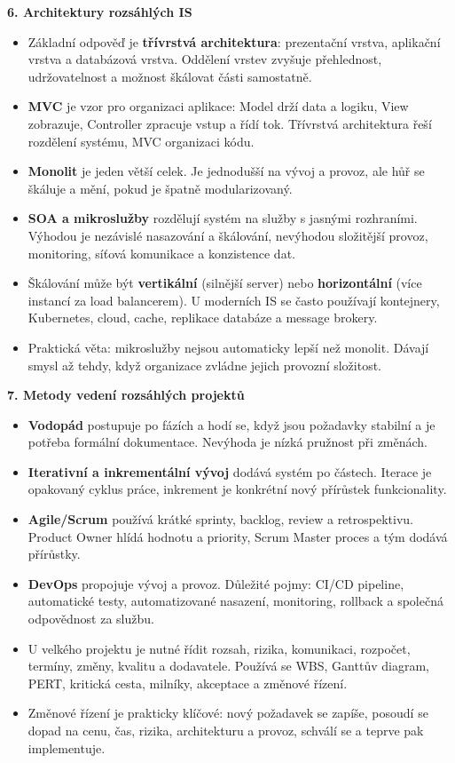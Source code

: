\textbf{6. Architektury rozsáhlých IS}
\begin{itemize}
  \item Základní odpověď je \textbf{třívrstvá architektura}: prezentační vrstva, aplikační vrstva a databázová vrstva. Oddělení vrstev zvyšuje přehlednost, udržovatelnost a možnost škálovat části samostatně.
  \item \textbf{MVC} je vzor pro organizaci aplikace: Model drží data a logiku, View zobrazuje, Controller zpracuje vstup a řídí tok. Třívrstvá architektura řeší rozdělení systému, MVC organizaci kódu.
  \item \textbf{Monolit} je jeden větší celek. Je jednodušší na vývoj a provoz, ale hůř se škáluje a mění, pokud je špatně modularizovaný.
  \item \textbf{SOA a mikroslužby} rozdělují systém na služby s jasnými rozhraními. Výhodou je nezávislé nasazování a škálování, nevýhodou složitější provoz, monitoring, síťová komunikace a konzistence dat.
  \item Škálování může být \textbf{vertikální} (silnější server) nebo \textbf{horizontální} (více instancí za load balancerem). U moderních IS se často používají kontejnery, Kubernetes, cloud, cache, replikace databáze a message brokery.
  \item Praktická věta: mikroslužby nejsou automaticky lepší než monolit. Dávají smysl až tehdy, když organizace zvládne jejich provozní složitost.
\end{itemize}

\textbf{7. Metody vedení rozsáhlých projektů}
\begin{itemize}
  \item \textbf{Vodopád} postupuje po fázích a hodí se, když jsou požadavky stabilní a je potřeba formální dokumentace. Nevýhoda je nízká pružnost při změnách.
  \item \textbf{Iterativní a inkrementální vývoj} dodává systém po částech. Iterace je opakovaný cyklus práce, inkrement je konkrétní nový přírůstek funkcionality.
  \item \textbf{Agile/Scrum} používá krátké sprinty, backlog, review a retrospektivu. Product Owner hlídá hodnotu a priority, Scrum Master proces a tým dodává přírůstky.
  \item \textbf{DevOps} propojuje vývoj a provoz. Důležité pojmy: CI/CD pipeline, automatické testy, automatizované nasazení, monitoring, rollback a společná odpovědnost za službu.
  \item U velkého projektu je nutné řídit rozsah, rizika, komunikaci, rozpočet, termíny, změny, kvalitu a dodavatele. Používá se WBS, Ganttův diagram, PERT, kritická cesta, milníky, akceptace a změnové řízení.
  \item Změnové řízení je prakticky klíčové: nový požadavek se zapíše, posoudí se dopad na cenu, čas, rizika, architekturu a provoz, schválí se a teprve pak implementuje.
\end{itemize}

